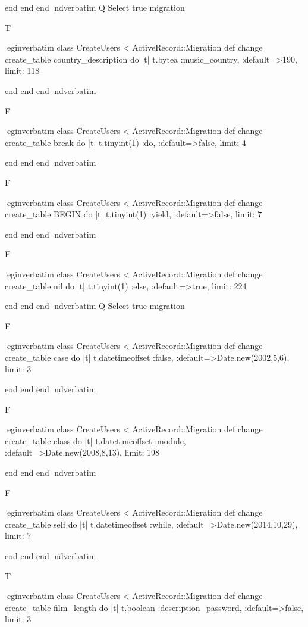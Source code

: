     end 
  end 
end
nd{verbatim}
Q
 Select true migration

T

egin{verbatim}
 class CreateUsers < ActiveRecord::Migration 
  def change 
    create_table country_description do |t| 
      t.bytea :music_country, :default=>190, limit: 118
    
    end 
  end 
end
nd{verbatim}

F

egin{verbatim}
 class CreateUsers < ActiveRecord::Migration 
  def change 
    create_table break do |t| 
      t.tinyint(1) :do, :default=>false, limit: 4
    
    end 
  end 
end
nd{verbatim}

F

egin{verbatim}
 class CreateUsers < ActiveRecord::Migration 
  def change 
    create_table BEGIN do |t| 
      t.tinyint(1) :yield, :default=>false, limit: 7
    
    end 
  end 
end
nd{verbatim}

F

egin{verbatim}
 class CreateUsers < ActiveRecord::Migration 
  def change 
    create_table nil do |t| 
      t.tinyint(1) :else, :default=>true, limit: 224
    
    end 
  end 
end
nd{verbatim}
Q
 Select true migration

F

egin{verbatim}
 class CreateUsers < ActiveRecord::Migration 
  def change 
    create_table case do |t| 
      t.datetimeoffset :false, :default=>Date.new(2002,5,6), limit: 3
    
    end 
  end 
end
nd{verbatim}

F

egin{verbatim}
 class CreateUsers < ActiveRecord::Migration 
  def change 
    create_table class do |t| 
      t.datetimeoffset :module, :default=>Date.new(2008,8,13), limit: 198
    
    end 
  end 
end
nd{verbatim}

F

egin{verbatim}
 class CreateUsers < ActiveRecord::Migration 
  def change 
    create_table self do |t| 
      t.datetimeoffset :while, :default=>Date.new(2014,10,29), limit: 7
    
    end 
  end 
end
nd{verbatim}

T

egin{verbatim}
 class CreateUsers < ActiveRecord::Migration 
  def change 
    create_table film_length do |t| 
      t.boolean :description_password, :default=>false, limit: 3
    
